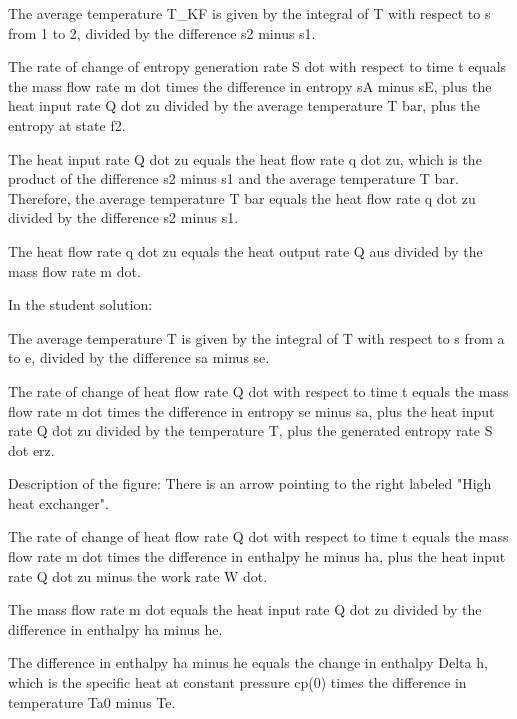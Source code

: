 The average temperature T_KF is given by the integral of T with respect to s from 1 to 2, divided by the difference s2 minus s1.

The rate of change of entropy generation rate S dot with respect to time t equals the mass flow rate m dot times the difference in entropy sA minus sE, plus the heat input rate Q dot zu divided by the average temperature T bar, plus the entropy at state f2.

The heat input rate Q dot zu equals the heat flow rate q dot zu, which is the product of the difference s2 minus s1 and the average temperature T bar. Therefore, the average temperature T bar equals the heat flow rate q dot zu divided by the difference s2 minus s1.

The heat flow rate q dot zu equals the heat output rate Q aus divided by the mass flow rate m dot.

In the student solution:

The average temperature T is given by the integral of T with respect to s from a to e, divided by the difference sa minus se.

The rate of change of heat flow rate Q dot with respect to time t equals the mass flow rate m dot times the difference in entropy se minus sa, plus the heat input rate Q dot zu divided by the temperature T, plus the generated entropy rate S dot erz.

Description of the figure: There is an arrow pointing to the right labeled "High heat exchanger".

The rate of change of heat flow rate Q dot with respect to time t equals the mass flow rate m dot times the difference in enthalpy he minus ha, plus the heat input rate Q dot zu minus the work rate W dot.

The mass flow rate m dot equals the heat input rate Q dot zu divided by the difference in enthalpy ha minus he.

The difference in enthalpy ha minus he equals the change in enthalpy Delta h, which is the specific heat at constant pressure cp(0) times the difference in temperature Ta0 minus Te.